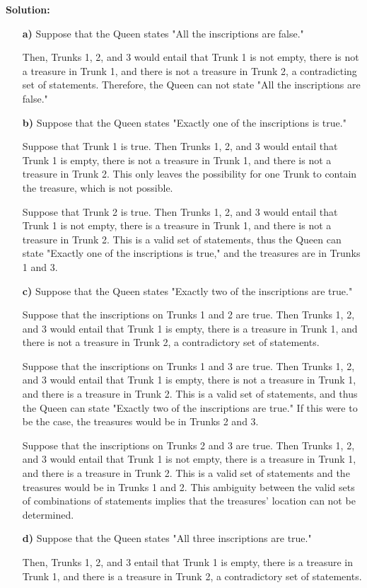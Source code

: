 \documentclass{Axon}
\begin{document}
\noindent
\textbf{Solution:}
\begin{enumerate}
    \item[\textbf{a)}] Suppose that the Queen states "All the inscriptions are false."

    Then, Trunks 1, 2, and 3 would entail that Trunk 1 is not empty, there is not a treasure in Trunk 1, and there is not a treasure in Trunk 2, a contradicting set of statements. Therefore, the Queen can not state "All the inscriptions are false."
    
    \item[\textbf{b)}] Suppose that the Queen states "Exactly one of the inscriptions is true."

    Suppose that Trunk 1 is true. Then Trunks 1, 2, and 3 would entail that Trunk 1 is empty, there is not a treasure in Trunk 1, and there is not a treasure in Trunk 2. This only leaves the possibility for one Trunk to contain the treasure, which is not possible.

    Suppose that Trunk 2 is true. Then Trunks 1, 2, and 3 would entail that Trunk 1 is not empty, there is a treasure in Trunk 1, and there is not a treasure in Trunk 2. This is a valid set of statements, thus the Queen can state "Exactly one of the inscriptions is true," and the treasures are in Trunks 1 and 3.
    
    \item[\textbf{c)}] Suppose that the Queen states "Exactly two of the inscriptions are true."

    Suppose that the inscriptions on Trunks 1 and 2 are true. Then Trunks 1, 2, and 3 would entail that Trunk 1 is empty, there is a treasure in Trunk 1, and there is not a treasure in Trunk 2, a contradictory set of statements.

    Suppose that the inscriptions on Trunks 1 and 3 are true. Then Trunks 1, 2, and 3 would entail that Trunk 1 is empty, there is not a treasure in Trunk 1, and there is a treasure in Trunk 2. This is a valid set of statements, and thus the Queen can state "Exactly two of the inscriptions are true." If this were to be the case, the treasures would be in Trunks 2 and 3.

    Suppose that the inscriptions on Trunks 2 and 3 are true. Then Trunks 1, 2, and 3 would entail that Trunk 1 is not empty, there is a treasure in Trunk 1, and there is a treasure in Trunk 2. This is a valid set of statements and the treasures would be in Trunks 1 and 2. This ambiguity between the valid sets of combinations of statements implies that the treasures' location can not be determined.
    
    \item[\textbf{d)}] Suppose that the Queen states "All three inscriptions are true."

    Then, Trunks 1, 2, and 3 entail that Trunk 1 is empty, there is a treasure in Trunk 1, and there is a treasure in Trunk 2, a contradictory set of statements.
\end{enumerate}
\end{document}

